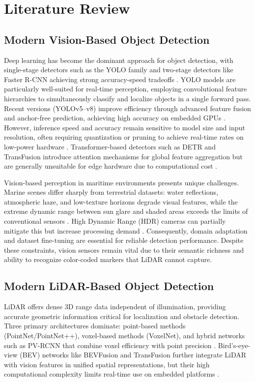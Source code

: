 \section{Literature Review}

\subsection{Modern Vision-Based Object Detection}
Deep learning has become the dominant approach for object detection, with single-stage detectors such as the YOLO family and two-stage detectors like Faster R-CNN achieving strong accuracy-speed tradeoffs \cite{he2016, ren2015, redmon2016}. YOLO models are particularly well-suited for real-time perception, employing convolutional feature hierarchies to simultaneously classify and localize objects in a single forward pass. Recent versions (YOLOv5–v8) improve efficiency through advanced feature fusion and anchor-free prediction, achieving high accuracy on embedded GPUs \cite{ultralytics, jocher2023}. However, inference speed and accuracy remain sensitive to model size and input resolution, often requiring quantization or pruning to achieve real-time rates on low-power hardware \cite{tan2020, wu2020}. Transformer-based detectors such as DETR and TransFusion introduce attention mechanisms for global feature aggregation but are generally unsuitable for edge hardware due to computational cost \cite{carion2020, bai2022transfusion}.

Vision-based perception in maritime environments presents unique challenges. Marine scenes differ sharply from terrestrial datasets: water reflections, atmospheric haze, and low-texture horizons degrade visual features, while the extreme dynamic range between sun glare and shaded areas exceeds the limits of conventional sensors \cite{bovcon2020, prasad2017}. High Dynamic Range (HDR) cameras can partially mitigate this but increase processing demand \cite{thompson2023}. Consequently, domain adaptation and dataset fine-tuning are essential for reliable detection performance. Despite these constraints, vision sensors remain vital due to their semantic richness and ability to recognize color-coded markers that LiDAR cannot capture.

\subsection{Modern LiDAR-Based Object Detection}
LiDAR offers dense 3D range data independent of illumination, providing accurate geometric information critical for localization and obstacle detection. Three primary architectures dominate: point-based methods (PointNet/PointNet++), voxel-based methods (VoxelNet), and hybrid networks such as PV-RCNN that combine voxel efficiency with point precision \cite{qi2017, qi2017pointnet++, zhou2018a, shi2021}. Bird’s-eye-view (BEV) networks like BEVFusion and TransFusion further integrate LiDAR with vision features in unified spatial representations, but their high computational complexity limits real-time use on embedded platforms \cite{liu2023bevfusion, bai2022transfusion}.

